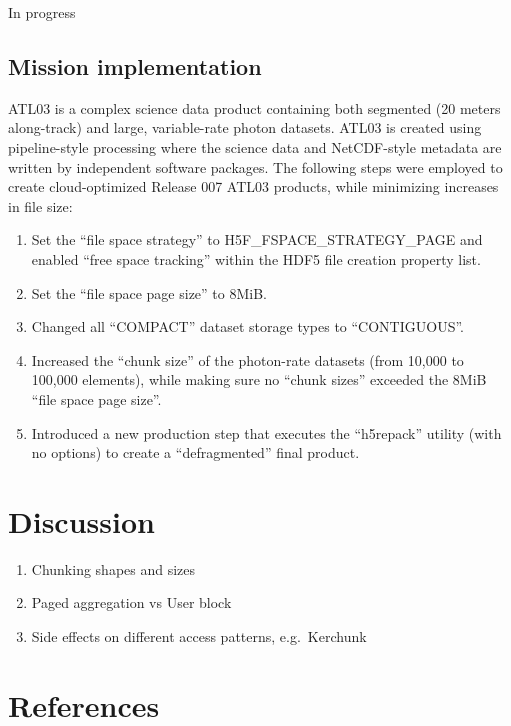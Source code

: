 \documentclass[
]{agujournal2019}
\providecommand{\tightlist}{%
  \setlength{\itemsep}{0pt}\setlength{\parskip}{0pt}}\usepackage{longtable,booktabs,array}
\begin{document}
In progress

\subsection{Mission implementation}\label{mission-implementation}

ATL03 is a complex science data product containing both segmented (20
meters along-track) and large, variable-rate photon datasets. ATL03 is
created using pipeline-style processing where the science data and
NetCDF-style metadata are written by independent software packages. The
following steps were employed to create cloud-optimized Release 007
ATL03 products, while minimizing increases in file size:

\begin{enumerate}
\def\labelenumi{\arabic{enumi}.}
\tightlist
\item
  Set the ``file space strategy'' to H5F\_FSPACE\_STRATEGY\_PAGE and
  enabled ``free space tracking'' within the HDF5 file creation property
  list.
\item
  Set the ``file space page size'' to 8MiB.
\item
  Changed all ``COMPACT'' dataset storage types to ``CONTIGUOUS''.
\item
  Increased the ``chunk size'' of the photon-rate datasets (from 10,000
  to 100,000 elements), while making sure no ``chunk sizes'' exceeded
  the 8MiB ``file space page size''.
\item
  Introduced a new production step that executes the ``h5repack''
  utility (with no options) to create a ``defragmented'' final product.
\end{enumerate}

\section{Discussion}\label{discussion}

\begin{enumerate}
\def\labelenumi{\arabic{enumi}.}
\tightlist
\item
  Chunking shapes and sizes
\item
  Paged aggregation vs User block
\item
  Side effects on different access patterns, e.g.~Kerchunk
\end{enumerate}

\section{References}\label{references}
\end{document}

